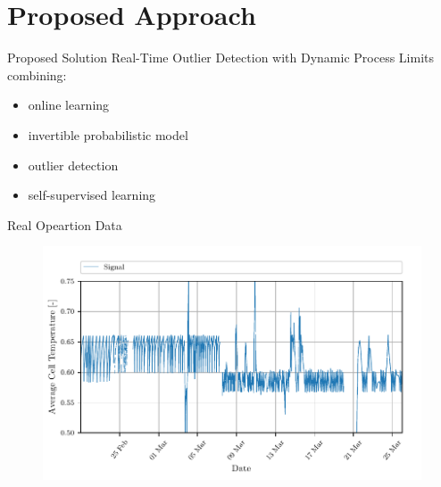 \documentclass[aspectratio=169]{beamer}
\begin{document}
\section{Proposed Approach}

\begin{frame}{Proposed Solution}
    Real-Time Outlier Detection with Dynamic Process Limits
    combining:
    \begin{itemize}
        \item online learning
        \item invertible probabilistic model
        \item outlier detection
        \item self-supervised learning
    \end{itemize}
\end{frame}


\begin{frame}{Real Opeartion Data}
    \begin{figure}
        \begin{center}
            \includegraphics[width=0.62\linewidth]{../ilustrate/pc2023/bess/all_signal.pdf}
        \end{center}
    \end{figure}
\end{frame}
\end{document}
